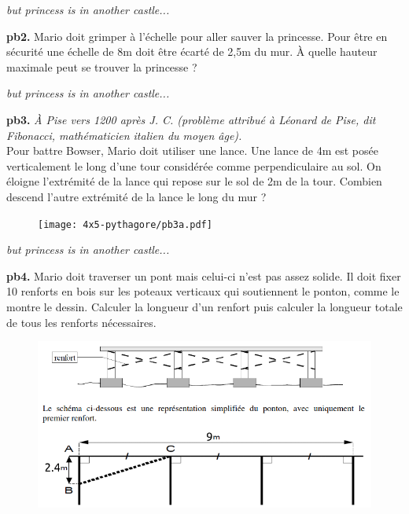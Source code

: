 \newpage

\textit{but princess is in another castle...}

\textbf{pb2.} Mario doit grimper à l'échelle pour aller sauver la princesse. Pour être en sécurité une échelle de 8m doit être écarté de 2,5m du mur. À quelle hauteur maximale peut se trouver la princesse ? \\
\Pointilles[5]

\begin{minipage}[t]{0.65\textwidth}
  \textit{but princess is in another castle...}

  \textbf{pb3.}  \textit{À Pise vers 1200 après J. C. (problème attribué à Léonard de Pise, dit Fibonacci, mathématicien italien   du moyen âge).} \\
  Pour battre Bowser, Mario doit utiliser une lance. Une lance de 4m est posée verticalement le long d’une tour considérée comme perpendiculaire au sol. On éloigne l’extrémité de la lance qui repose sur le sol de 2m de la tour. Combien descend l’autre extrémité de la lance le long du mur ?
  \Pointilles[6]
  \end{minipage}
  \begin{minipage}[t]{0.35\textwidth}
  \begin{figure}[H]
    \centering
    \texttt{[image: 4x5-pythagore/pb3a.pdf]}
  \end{figure}
\end{minipage}

\Pointilles[2]

\textit{but princess is in another castle...}

\textbf{pb4.}  Mario doit traverser un pont mais celui-ci n'est pas assez solide. Il doit fixer 10 renforts en bois sur les poteaux verticaux qui soutiennent le ponton, comme le montre le dessin. Calculer la longueur d'un renfort puis calculer la longueur totale de tous les renforts nécessaires. 
  
\begin{figure}[H]
  \centering
  \includegraphics[width=0.6\linewidth]{4x5-pythagore/pb4a.png}
\end{figure}
\Pointilles[10]

